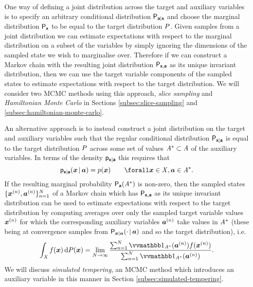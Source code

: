 One way of defining a joint distribution across the target and auxiliary variables is to specify an arbitrary conditional distribution $\mathsf{P}_{\boldsymbol{\mathsf{a}}|\boldsymbol{\mathsf{x}}}$ and choose the marginal distribution $\mathsf{P}_{\boldsymbol{\mathsf{x}}}$ to be equal to the target distribution $P$. Given samples from a joint distribution we can estimate expectations with respect to the marginal distribution on a subset of the variables by simply ignoring the dimensions of the sampled state we wish to marginalise over. Therefore if we can construct a Markov chain with the resulting joint distribution $\mathsf{P}_{\boldsymbol{\mathsf{x}},\boldsymbol{\mathsf{a}}}$ as its unique invariant distribution, then we can use the target variable components of the sampled states to estimate expectations with respect to the target distribution. We will consider two \ac{MCMC} methods using this approach, \emph{slice sampling} and \emph{Hamiltonian Monte Carlo} in Sections \ref{subsec:slice-sampling} and \ref{subsec:hamiltonian-monte-carlo}.

An alternative approach is to instead construct a joint distribution on the target and auxiliary variables such that the regular conditional distribution $\mathsf{P}_{\boldsymbol{\mathsf{x}}|\boldsymbol{\mathsf{a}}}$ is equal to the target distribution $P$ across some set of values $\mathit{A}^* \subset \mathit{A}$ of the auxiliary variables. In terms of the density $\mathsf{p}_{\boldsymbol{\mathsf{x}}|\boldsymbol{\mathsf{a}}}$ this requires that
\begin{equation}\label{eq:conditional-auxiliary-variable-property}
  \pden{\rvct{x}|\rvct{a}}(\vct{x}\gvn\vct{a}) = \tgtdens(\vct{x}) \qquad \forall \vct{x} \in \set{X}, \vct{a} \in \set{A}^*.
\end{equation}
If the resulting marginal probability $\mathsf{P}_{\boldsymbol{\mathsf{a}}}(\mathit{A}^*)$ is non-zero, then the sampled states $\lbrace \boldsymbol{x}^{(n)},\boldsymbol{a}^{(n)}\rbrace_{n=1}^N$ of a Markov chain which has $\mathsf{P}_{\boldsymbol{\mathsf{x}},\boldsymbol{\mathsf{a}}}$ as its unique invariant distribution can be used to estimate expectations with respect to the target distribution by computing averages over only the sampled target variable values $\boldsymbol{x}^{(n)}$ for which the corresponding auxiliary variables $\boldsymbol{a}^{(n)}$ take values in $\mathit{A}^*$ (these being at convergence samples from $\mathsf{P}_{\boldsymbol{x}|\boldsymbol{a}}(\cdot \operatorname{|} \boldsymbol{a})$ and so the target distribution), i.e.
\begin{equation}\label{eq:conditional-auxiliary-variable-estimator}
  \int_{\set{X}} f(\vct{x}) \,\dr\tgtprob(\vct{x}) =
  \lim_{N\to \infty} 
  \frac
    {\sum_{n=1}^N \ind{\set{A}^*}(\vct{a}^{(n)}) f(\vct{x}^{(n)})}
    {\sum_{n=1}^N \ind{\set{A}^*}(\vct{a}^{(n)})}.
\end{equation}
We will discuss \emph{simulated tempering}, an \ac{MCMC} method which introduces an auxiliary variable in this manner in Section \ref{subsec:simulated-tempering}.

